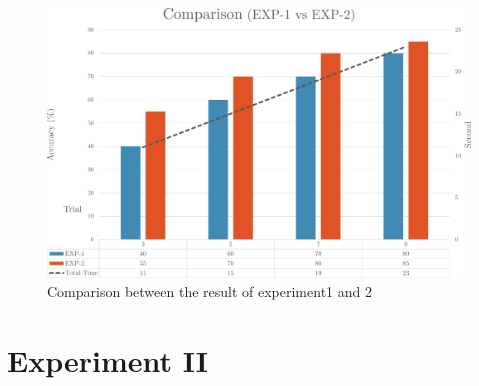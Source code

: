 \begin{figure}[ht]
	\centering
	\includegraphics[width=\textwidth]{chapter7/result_12.pdf}
	\caption{Comparison between the result of experiment1 and 2}
\end{figure}


\section{Experiment II}

























